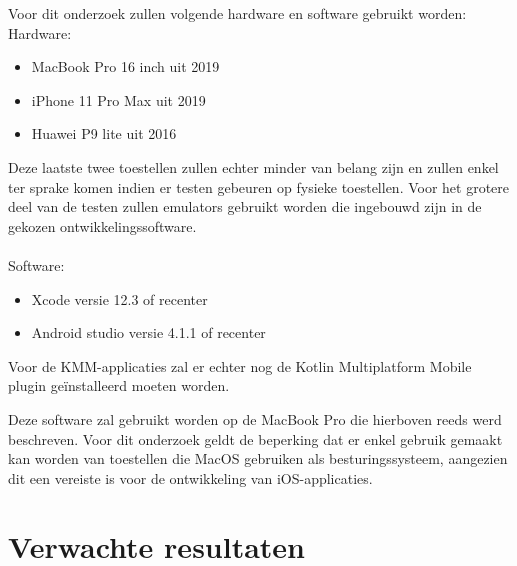 Voor dit onderzoek zullen volgende hardware en software gebruikt worden:\\
Hardware:
\begin{itemize}
    \item MacBook Pro 16 inch uit 2019
    \item iPhone 11 Pro Max uit 2019
    \item Huawei P9 lite uit 2016
\end{itemize}
Deze laatste twee toestellen zullen echter minder van belang zijn en zullen enkel ter sprake komen indien er testen gebeuren op fysieke toestellen. Voor het grotere deel van de testen zullen emulators gebruikt worden die ingebouwd zijn in de gekozen ontwikkelingssoftware.\\
\\
Software:
\begin{itemize}
    \item Xcode versie 12.3 of recenter
    \item Android studio versie 4.1.1 of recenter
\end{itemize}
Voor de KMM-applicaties zal er echter nog de Kotlin Multiplatform Mobile plugin geïnstalleerd moeten worden.

Deze software zal gebruikt worden op de MacBook Pro die hierboven reeds werd beschreven. Voor dit onderzoek geldt de beperking dat er enkel gebruik gemaakt kan worden van toestellen die MacOS gebruiken als besturingssysteem, aangezien dit een vereiste is voor de ontwikkeling van iOS-applicaties.

\section{Verwachte resultaten}
\label{sec:verwachte_resultaten}

